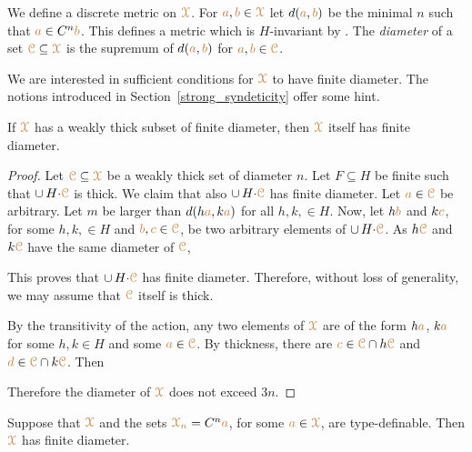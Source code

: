We define a discrete metric on $\mrX$.
For ${\mr a},{\mr b}\in\mrX$ let $d({\mr a},{\mr b})$ be the minimal $n$ such that ${\mr a}\in C^n{\mr b}$.
This defines a metric which is $H$-invariant by .
The \emph{diameter\/} of a set $\mrC\subseteq\mrX$ is the supremum of $d({\mr a},{\mr b})$ for ${\mr a},{\mr b}\in\mrC$.

We are interested in sufficient conditions for $\mrX$ to have finite diameter.
The notions introduced in Section~\ref{strong_syndeticity} offer some hint.

\begin{proposition}\label{prop_wpers_finite_diameter}
  If $\mrX$ has a weakly thick subset of finite diameter, then $\mrX$ itself has finite diameter.
\end{proposition}

\begin{proof}
  Let $\mrC\subseteq\mrX$ be a weakly thick set of diameter $n$.
  Let $F\subseteq H$ be finite such that $\cup\,H{\cdot}\mrC$ is thick.
  We claim that also $\cup\,H{\cdot}\mrC$ has finite diameter.
  Let ${\mr a}\in\mrC$ be arbitrary.
  Let $m$ be larger than $d(h{\mr a}, k{\mr a})$ for all $h,k,\in H$.
  Now, let $h{\mr b}$ and $k{\mr c}$, for some $h,k,\in H$ and ${\mr b},{\mr c}\in\mrC$, be two arbitrary elements of $\cup\,H{\cdot}\mrC$.
  As $h\mrC$ and $k\mrC$ have the same diameter of $\mrC$, 



  This proves that $\cup\,H{\cdot}\mrC$ has finite diameter.
  Therefore, without loss of generality, we may assume that $\mrC$ itself is thick.
  
  By the transitivity of the action, any two elements of $\mrX$ are of the form $h{\mr a}$, $k{\mr a}$ for some $h,k\in H$ and some ${\mr a}\in\mrC$.
  By thickness, there are ${\mr c}\in\mrC\cap h\mrC$ and ${\mr d}\in\mrC\cap k\mrC$.
  Then 



  Therefore the diameter of $\mrX$ does not exceed $3n$.
\end{proof}

\begin{theorem}\label{thm_newelski}
  Suppose that $\mrX$ and the sets ${\mr\X_n}=C^n{\mr a}$, for some ${\mr a}\in\mrX$, are type-definable.
  Then $\mrX$ has finite diameter.
\end{theorem}

